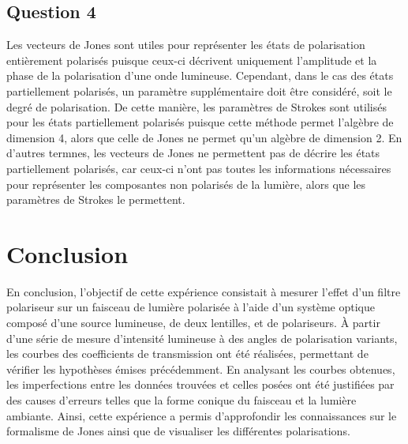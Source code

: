 \documentclass[11pt,letterpaper]{article}
\begin{document}
\subsection{Question 4}
Les vecteurs de Jones sont utiles pour représenter les états de polarisation entièrement polarisés puisque ceux-ci décrivent uniquement l'amplitude et la phase de la polarisation d'une onde lumineuse. Cependant, dans le cas des états partiellement polarisés, un paramètre supplémentaire doit être considéré, soit le degré de polarisation. De cette manière, les paramètres de Strokes sont utilisés pour les états partiellement polarisés puisque cette méthode permet l'algèbre de dimension 4, alors que celle de Jones ne permet qu'un algèbre de dimension 2. En d'autres termnes, les vecteurs de Jones ne permettent pas de décrire les états partiellement polarisés, car ceux-ci n'ont pas toutes les informations nécessaires pour représenter les composantes non polarisés de la lumière, alors que les paramètres de Strokes le permettent.

\section{Conclusion}
En conclusion, l'objectif de cette expérience consistait à mesurer l'effet d'un filtre polariseur sur un faisceau de lumière polarisée à l'aide d'un système optique composé d'une source lumineuse, de deux lentilles, et de polariseurs. À partir d'une série de mesure d'intensité lumineuse à des angles de polarisation variants, les courbes des coefficients de transmission ont été réalisées, permettant de vérifier les hypothèses émises précédemment. En analysant les courbes obtenues, les imperfections entre les données trouvées et celles posées ont été justifiées par des causes d'erreurs telles que la forme conique du faisceau et la lumière ambiante. Ainsi, cette expérience a permis d'approfondir les connaissances sur le formalisme de Jones ainsi que de visualiser les différentes polarisations.


\clearpage

% 
% 
\end{document}
